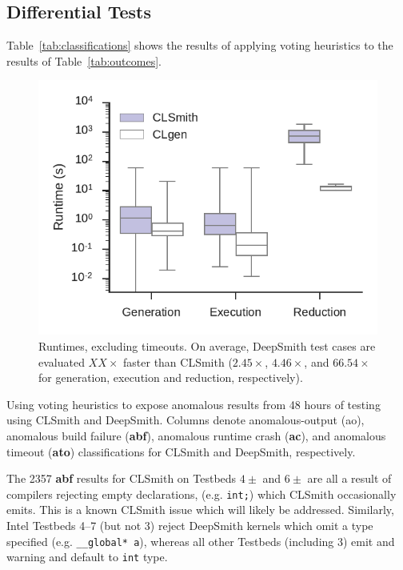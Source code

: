 \subsection{Differential Tests}

Table~\ref{tab:classifications} shows the results of applying voting heuristics to the results of Table~\ref{tab:outcomes}.

\begin{figure}
	\centering %
	\includegraphics[width=\columnwidth]{build/img/runtimes}%
	\caption{%
		Runtimes, excluding timeouts. On average, DeepSmith test cases are evaluated $XX\times$ faster than CLSmith ($2.45\times$, $4.46\times$, and $66.54\times$ for generation, execution and reduction, respectively).%
	}%
	\label{fig:runtimes} %
\end{figure}


\begin{table}
	\scriptsize %
	\centering %
	
	\caption{Using voting heuristics to expose anomalous results from 48 hours of testing using CLSmith and DeepSmith. Columns denote anomalous-output (ao), anomalous build failure (\textbf{abf}), anomalous runtime crash (\textbf{ac}), and anomalous timeout (\textbf{ato}) classifications for CLSmith and DeepSmith, respectively.}
	\label{tab:classifications}
\end{table}

The 2357 \textbf{abf} results for CLSmith on Testbeds $4\pm$ and $6\pm$ are all a result of compilers rejecting empty declarations, (e.g. \texttt{int;}) which CLSmith occasionally emits. This is a known CLSmith issue which will likely be addressed.
Similarly, Intel Testbeds 4--7 (but not 3) reject DeepSmith kernels which omit a type specified (e.g. \texttt{\_\_global* a}), whereas all other Testbeds (including 3) emit and warning and default to \texttt{int} type.

